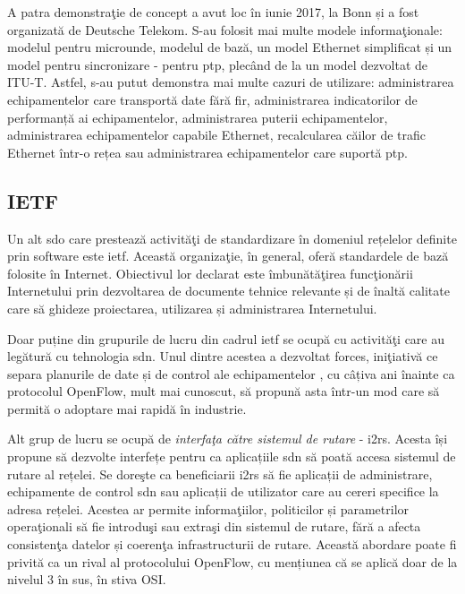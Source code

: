 A patra demonstraţie de concept a avut loc în iunie 2017, la Bonn și a fost organizată de Deutsche Telekom. S-au folosit mai multe modele informaţionale: modelul pentru microunde, modelul de bază, un model Ethernet simplificat și un model pentru sincronizare - pentru \gls{ptp}, plecând de la un model dezvoltat de ITU-T. Astfel, s-au putut demonstra mai multe cazuri de utilizare: administrarea echipamentelor care transportă date fără fir, administrarea indicatorilor de performanță ai echipamentelor, administrarea puterii echipamentelor, administrarea echipamentelor capabile Ethernet, recalcularea căilor de trafic Ethernet într-o rețea sau administrarea echipamentelor care suportă \gls{ptp}. 

\subsection{IETF}

Un alt \gls{sdo} care prestează activităţi de standardizare în domeniul rețelelor definite prin software este \gls{ietf}. Această organizaţie, în general, oferă standardele de bază folosite în Internet. Obiectivul lor declarat este îmbunătăţirea funcţionării Internetului prin dezvoltarea de documente tehnice relevante și de înaltă calitate care să ghideze proiectarea, utilizarea și administrarea Internetului.

Doar puține din grupurile de lucru din cadrul \gls{ietf} se ocupă cu activităţi care au legătură cu tehnologia \gls{sdn}. Unul dintre acestea a dezvoltat \gls{forces}, iniţiativă ce separa planurile de date și de control ale echipamentelor \cite{doria2010forwarding}, cu câțiva ani înainte ca protocolul OpenFlow, mult mai cunoscut, să propună asta într-un mod care să permită o adoptare mai rapidă în industrie.

Alt grup de lucru se ocupă de \textit{interfaţa către sistemul de rutare} - \gls{i2rs}. Acesta își propune să dezvolte interfețe pentru ca aplicațiile \gls{sdn} să poată accesa sistemul de rutare al rețelei. Se doreşte ca beneficiarii \gls{i2rs} să fie aplicații de administrare, echipamente de control \gls{sdn} sau aplicații de utilizator care au cereri specifice la adresa rețelei. Acestea ar permite informaţiilor, politicilor și parametrilor operaţionali să fie introduşi sau extraşi din sistemul de rutare, fără a afecta consistenţa datelor și coerenţa infrastructurii de rutare. Această abordare poate fi privită ca un rival al protocolului OpenFlow, cu mențiunea că se aplică doar de la nivelul 3 în sus, în stiva OSI.

